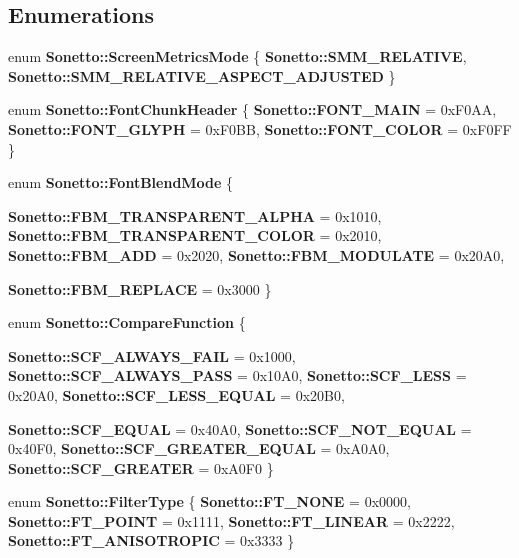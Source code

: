\subsection*{Enumerations}
\begin{CompactItemize}
\item 
enum {\bf Sonetto::ScreenMetricsMode} \{ {\bf Sonetto::SMM\_\-RELATIVE}, 
{\bf Sonetto::SMM\_\-RELATIVE\_\-ASPECT\_\-ADJUSTED}
 \}
\item 
enum {\bf Sonetto::FontChunkHeader} \{ {\bf Sonetto::FONT\_\-MAIN} =  0xF0AA, 
{\bf Sonetto::FONT\_\-GLYPH} =  0xF0BB, 
{\bf Sonetto::FONT\_\-COLOR} =  0xF0FF
 \}
\item 
enum {\bf Sonetto::FontBlendMode} \{ \par
{\bf Sonetto::FBM\_\-TRANSPARENT\_\-ALPHA} =  0x1010, 
{\bf Sonetto::FBM\_\-TRANSPARENT\_\-COLOR} =  0x2010, 
{\bf Sonetto::FBM\_\-ADD} =  0x2020, 
{\bf Sonetto::FBM\_\-MODULATE} =  0x20A0, 
\par
{\bf Sonetto::FBM\_\-REPLACE} =  0x3000
 \}
\item 
enum {\bf Sonetto::CompareFunction} \{ \par
{\bf Sonetto::SCF\_\-ALWAYS\_\-FAIL} =  0x1000, 
{\bf Sonetto::SCF\_\-ALWAYS\_\-PASS} =  0x10A0, 
{\bf Sonetto::SCF\_\-LESS} =  0x20A0, 
{\bf Sonetto::SCF\_\-LESS\_\-EQUAL} =  0x20B0, 
\par
{\bf Sonetto::SCF\_\-EQUAL} =  0x40A0, 
{\bf Sonetto::SCF\_\-NOT\_\-EQUAL} =  0x40F0, 
{\bf Sonetto::SCF\_\-GREATER\_\-EQUAL} =  0xA0A0, 
{\bf Sonetto::SCF\_\-GREATER} =  0xA0F0
 \}
\item 
enum {\bf Sonetto::FilterType} \{ {\bf Sonetto::FT\_\-NONE} =  0x0000, 
{\bf Sonetto::FT\_\-POINT} =  0x1111, 
{\bf Sonetto::FT\_\-LINEAR} =  0x2222, 
{\bf Sonetto::FT\_\-ANISOTROPIC} =  0x3333
 \}
\end{CompactItemize}
